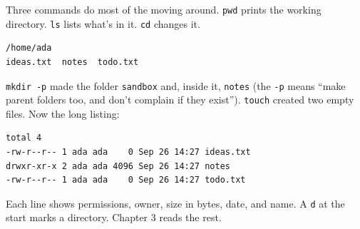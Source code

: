 Three commands do most of the moving around. \texttt{pwd} prints the working directory. \texttt{ls} lists what's in it. \texttt{cd} changes it.

\begin{codeblock}

\begin{Shaded}
\begin{Highlighting}[]
 
\end{Highlighting}
\end{Shaded}

\end{codeblock}

\begin{codeblock}
\begin{Verbatim}[formatcom=\outputstyle]
/home/ada
ideas.txt  notes  todo.txt
\end{Verbatim}
\end{codeblock}


\texttt{mkdir\ -p} made the folder \texttt{sandbox} and, inside it, \texttt{notes} (the \texttt{-p} means ``make parent folders too, and don't complain if they exist''). \texttt{touch} created two empty files. Now the long listing:

\begin{codeblock}

\begin{Shaded}
\begin{Highlighting}[]
 
\end{Highlighting}
\end{Shaded}

\end{codeblock}

\begin{codeblock}
\begin{Verbatim}[formatcom=\outputstyle]
total 4
-rw-r--r-- 1 ada ada    0 Sep 26 14:27 ideas.txt
drwxr-xr-x 2 ada ada 4096 Sep 26 14:27 notes
-rw-r--r-- 1 ada ada    0 Sep 26 14:27 todo.txt
\end{Verbatim}
\end{codeblock}

Each line shows permissions, owner, size in bytes, date, and name. A \texttt{d} at the start marks a directory. Chapter 3 reads the rest.

